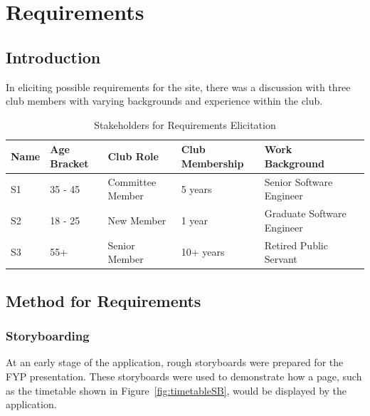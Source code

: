 \chapter{Requirements}
\label{requirements}

\section{Introduction}

In eliciting possible requirements for the site, there was a discussion with three club members with varying backgrounds and experience within the club.

\begin{table}[H]
\caption{Stakeholders for Requirements Elicitation}
\begin{center}
    \begin{tabular}{ | l | l | l | l | l| p{5cm} |}
    \hline
    Name & Age Bracket & Club Role & Club Membership & Work Background \\ \hline
	S1 & 35 - 45& Committee Member & 5 years & Senior Software Engineer \\ \hline
	S2 & 18 - 25 & New Member & 1 year & Graduate Software Engineer \\ \hline
	S3 & 55+ & Senior Member & 10+ years & Retired Public Servant \\ \hline
    \end{tabular}
\end{center}
\label{fig:userelicit}
\end{table}

\section{Method for Requirements}

\subsection{Storyboarding}

At an early stage of the application, rough storyboards were prepared for the FYP presentation. These storyboards were used to demonstrate how a page, such as the timetable shown in Figure~\ref{fig:timetableSB}, would be displayed by the application.


